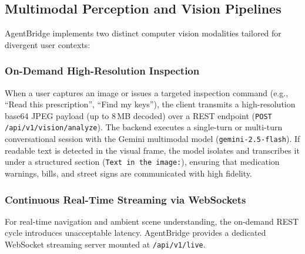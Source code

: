 \documentclass[10pt,a4paper]{article}
\begin{document}
\subsection{Multimodal Perception and Vision Pipelines}
AgentBridge implements two distinct computer vision modalities tailored for divergent user contexts:

\subsubsection{On-Demand High-Resolution Inspection}
When a user captures an image or issues a targeted inspection command (e.g., ``Read this prescription'', ``Find my keys''), the client transmits a high-resolution base64 JPEG payload (up to 8\,MB decoded) over a REST endpoint (\texttt{POST /api/v1/vision/analyze}). The backend executes a single-turn or multi-turn conversational session with the Gemini multimodal model (\texttt{gemini-2.5-flash}). If readable text is detected in the visual frame, the model isolates and transcribes it under a structured section (\texttt{Text in the image:}), ensuring that medication warnings, bills, and street signs are communicated with high fidelity.

\subsubsection{Continuous Real-Time Streaming via WebSockets}
For real-time navigation and ambient scene understanding, the on-demand REST cycle introduces unacceptable latency. AgentBridge provides a dedicated WebSocket streaming server mounted at \texttt{/api/v1/live}. 
\end{document}
